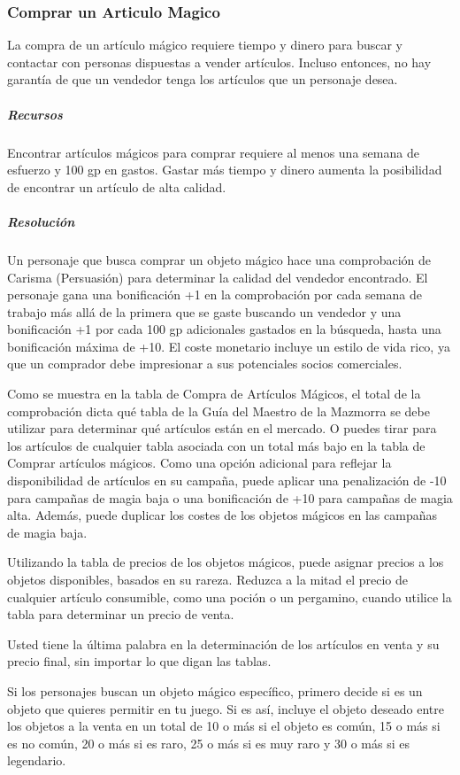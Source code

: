 \documentclass[a4paper,twocolumn,openany,10pt]{dndbook}
\begin{document}
\subsubsection{Comprar un Articulo Magico}
La compra de un artículo mágico requiere tiempo y dinero para buscar y contactar con personas dispuestas a vender artículos.
Incluso entonces, no hay garantía de que un vendedor tenga los artículos que un personaje desea.

\subparagraph{Recursos} Encontrar artículos mágicos para comprar requiere al menos una semana de esfuerzo y 100 gp en gastos.
Gastar más tiempo y dinero aumenta la posibilidad de encontrar un artículo de alta calidad.

\subparagraph{Resolución} Un personaje que busca comprar un objeto mágico hace una comprobación de Carisma (Persuasión) para
determinar la calidad del vendedor encontrado. El personaje gana una bonificación +1 en la comprobación por cada semana de
trabajo más allá de la primera que se gaste buscando un vendedor y una bonificación +1 por cada 100 gp adicionales gastados en
la búsqueda, hasta una bonificación máxima de +10. El coste monetario incluye un estilo de vida rico, ya que un comprador debe
impresionar a sus potenciales socios comerciales.

Como se muestra en la tabla de Compra de Artículos Mágicos, el total de la comprobación dicta qué tabla de la Guía del Maestro
de la Mazmorra se debe utilizar para determinar qué artículos están en el mercado. O puedes tirar para los artículos de
cualquier tabla asociada con un total más bajo en la tabla de Comprar artículos mágicos. Como una opción adicional para reflejar
la disponibilidad de artículos en su campaña, puede aplicar una penalización de -10 para campañas de magia baja o una
bonificación de +10 para campañas de magia alta. Además, puede duplicar los costes de los objetos mágicos en las campañas de
magia baja.

Utilizando la tabla de precios de los objetos mágicos, puede asignar precios a los objetos disponibles, basados en su rareza.
Reduzca a la mitad el precio de cualquier artículo consumible, como una poción o un pergamino, cuando utilice la tabla para
determinar un precio de venta.

Usted tiene la última palabra en la determinación de los artículos en venta y su precio final, sin importar lo que digan las
tablas.

Si los personajes buscan un objeto mágico específico, primero decide si es un objeto que quieres permitir en tu juego. Si es así,
incluye el objeto deseado entre los objetos a la venta en un total de 10 o más si el objeto es común, 15 o más si es no común,
20 o más si es raro, 25 o más si es muy raro y 30 o más si es legendario. 
\end{document}
